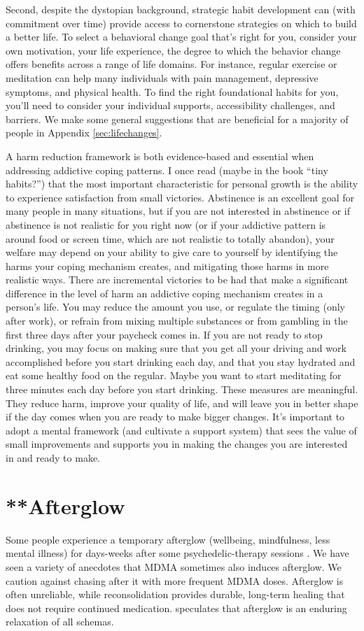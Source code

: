 \documentclass[12pt,letterpaper]{book}
\begin{document}
Second, despite the dystopian background, strategic habit development can (with commitment over time) provide access to cornerstone strategies on which to build a better life. To select a behavioral change goal that's right for you, consider your own motivation, your life experience, the degree to which the behavior change offers benefits across a range of life domains. For instance, regular exercise or meditation can help many individuals with pain management, depressive symptoms, and physical health. To find the right foundational habits for you, you'll need to consider your individual supports, accessibility challenges, and barriers. We make some general suggestions that are beneficial for a majority of people in Appendix \ref{sec:lifechanges}.

A harm reduction framework is both evidence-based and essential when addressing addictive coping patterns. I once read (maybe in the book “tiny habits?”) that the most important characteristic for personal growth is the ability to experience satisfaction from small victories. Abstinence is an excellent goal for many people in many situations, but if you are not interested in abstinence or if abstinence is not realistic for you right now (or if your addictive pattern is around food or screen time, which are not realistic to totally abandon), your welfare may depend on your ability to give care to yourself by identifying the harms your coping mechanism creates, and mitigating those harms in more realistic ways. There are incremental victories to be had that make a significant difference in the level of harm an addictive coping mechanism creates in a person's life. You may reduce the amount you use, or regulate the timing (only after work), or refrain from mixing multiple substances or from gambling in the first three days after your paycheck comes in. If you are not ready to stop drinking, you may focus on making sure that you get all your driving and work accomplished before you start drinking each day, and that you stay hydrated and eat some healthy food on the regular. Maybe you want to start meditating for three minutes each day before you start drinking. These measures are meaningful. They reduce harm, improve your quality of life, and will leave you in better shape if the day comes when you are ready to make bigger changes. It's important to adopt a mental framework (and cultivate a support system) that sees the value of small improvements and supports you in making the changes you are interested in and ready to make.
\section{**Afterglow}
Some people experience a temporary afterglow (wellbeing, mindfulness, less mental illness) for days-weeks after some psychedelic-therapy sessions \cite{evansAfterglow}. We have seen a variety of anecdotes that MDMA sometimes also induces afterglow. We caution against chasing after it with more frequent MDMA doses. Afterglow is often unreliable, while reconsolidation provides durable, long-term healing that does not require continued medication. \textcite{carhart2019rebus} speculates that afterglow is an enduring relaxation of all schemas.
\end{document}
